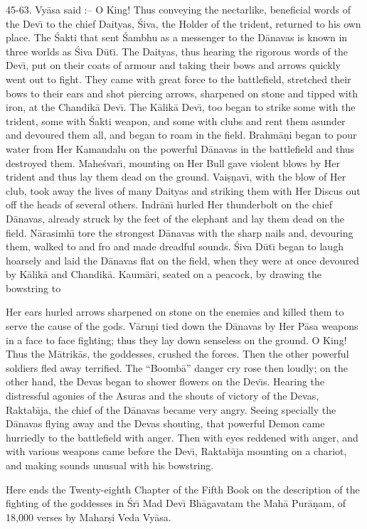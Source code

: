 45-63. Vy\=asa said :-- O King! Thus conveying the nectarlike, beneficial words of the Dev\={\i} to the chief Daityas, \'Siva, the Holder of the trident, returned to his own place. The \'Sakti that sent \'Sambhu as a messenger to the D\=anavas is known in three worlds as \'Siva D\=ut\={\i}. The Daityas, thus hearing the rigorous words of the Dev\={\i}, put on their coats of armour and taking their bows and arrows quickly went out to fight. They came with great force to the battlefield, stretched their bows to their ears and shot piercing arrows, sharpened on stone and tipped with iron, at the Chandik\=a Dev\={\i}. The K\=alik\=a Dev\={\i}, too began to strike some with the trident, some with \'Sakti weapon, and some with clubs and rent them asunder and devoured them all, and began to roam in the field. Brahm\=a\d{n}i began to pour water from Her Kamandalu on the powerful D\=anavas in the battlefield and thus destroyed them. Mahe\'svar\={\i}, mounting on Her Bull gave violent blows by Her trident and thus lay them dead on the ground. Vai\d{s}\d{n}av\={\i}, with the blow of Her club, took away the lives of many Daityas and striking them with Her Discus out off the heads of several others. Indr\=an\={\i} hurled Her thunderbolt on the chief D\=anavas, already struck by the feet of the elephant and lay them dead on the field. N\=arasimh\={\i} tore the strongest D\=anavas with the sharp nails and, devouring them, walked to and fro and made dreadful sounds. \'Siva D\=ut\={\i} began to laugh hoarsely and laid the D\=anavas flat on the field, when they were at once devoured by K\=alik\=a and Chandik\=a. Kaum\=ari, seated on a peacock, by drawing the bowstring to

Her ears hurled arrows sharpened on stone on the enemies and killed them to serve the cause of the gods. V\=aru\d{n}i tied down the D\=anavas by Her P\=asa weapons in a face to face fighting; thus they lay down senseless on the ground. O King! Thus the M\=atrik\=as, the goddesses, crushed the forces. Then the other powerful soldiers fled away terrified. The ``Boomb\=a'' danger cry rose then loudly; on the other hand, the Devas began to shower flowers on the Dev\={\i}s. Hearing the distressful agonies of the Asuras and the shouts of victory of the Devas, Raktab\={\i}ja, the chief of the D\=anavas became very angry. Seeing specially the D\=anavas flying away and the Devas shouting, that powerful Demon came hurriedly to the battlefield with anger. Then with eyes reddened with anger, and with various weapons came before the Dev\={\i}, Raktab\={\i}ja mounting on a chariot, and making sounds unusual with his bowstring.

Here ends the Twenty-eighth Chapter of the Fifth Book on the description of the fighting of the goddesses in \'Sr\={\i} Mad Dev\={\i} Bh\=agavatam the Mah\=a Pur\=a\d{n}am, of 18,000 verses by Mahar\d{s}i Veda Vy\=asa.



